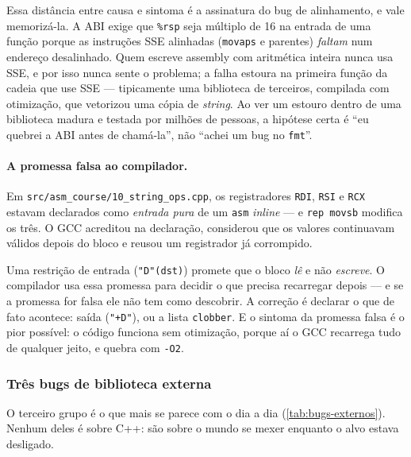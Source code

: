 \begin{regra}
Essa distância entre causa e sintoma é a assinatura do bug de alinhamento, e
vale memorizá-la. A ABI exige que \texttt{\%rsp} seja múltiplo de 16 na entrada
de uma função porque as instruções SSE alinhadas (\texttt{movaps} e parentes)
\emph{faltam} num endereço desalinhado. Quem escreve assembly com aritmética
inteira nunca usa SSE, e por isso nunca sente o problema; a falha estoura na
primeira função da cadeia que use SSE --- tipicamente uma biblioteca de
terceiros, compilada com otimização, que vetorizou uma cópia de \emph{string}.
Ao ver um estouro dentro de uma biblioteca madura e testada por milhões de
pessoas, a hipótese certa é ``eu quebrei a ABI antes de chamá-la'', não
``achei um bug no \texttt{fmt}''.
\end{regra}

\paragraph{A promessa falsa ao compilador.} Em
\texttt{src/asm\_course/10\_string\_ops.cpp}, os registradores
\texttt{RDI}, \texttt{RSI} e \texttt{RCX} estavam declarados como \emph{entrada
pura} de um \texttt{asm} \emph{inline} --- e \texttt{rep movsb} modifica os
três. O GCC acreditou na declaração, considerou que os valores continuavam
válidos depois do bloco e reusou um registrador já corrompido.

\begin{armadilha}
Uma restrição de entrada (\texttt{"D"(dst)}) promete que o bloco \emph{lê} e não
\emph{escreve}. O compilador usa essa promessa para decidir o que precisa
recarregar depois --- e se a promessa for falsa ele não tem como descobrir. A
correção é declarar o que de fato acontece: saída (\texttt{"+D"}), ou a lista
\texttt{clobber}. E o sintoma da promessa falsa é o pior possível: o código
funciona sem otimização, porque aí o GCC recarrega tudo de qualquer jeito, e
quebra com \texttt{-O2}.
\end{armadilha}

\subsubsection{Três bugs de biblioteca externa}

O terceiro grupo é o que mais se parece com o dia a dia
(\cref{tab:bugs-externos}). Nenhum deles é sobre C++: são sobre o mundo se
mexer enquanto o alvo estava desligado.

